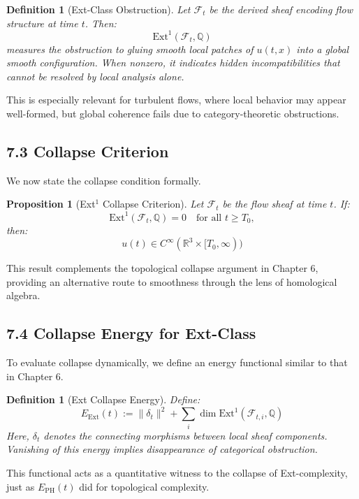 \documentclass[11pt]{article}
\newtheorem{definition}[theorem]{Definition}
\newtheorem{proposition}[theorem]{Proposition}
\begin{document}
\begin{definition}[Ext-Class Obstruction]
Let \( \mathcal{F}_t \) be the derived sheaf encoding flow structure at time \( t \).  
Then:
\[
\mathrm{Ext}^1(\mathcal{F}_t, \mathbb{Q})
\]
measures the obstruction to gluing smooth local patches of \( u(t,x) \) into a global smooth configuration.  
When nonzero, it indicates hidden incompatibilities that cannot be resolved by local analysis alone.
\end{definition}

This is especially relevant for turbulent flows, where local behavior may appear well-formed,  
but global coherence fails due to category-theoretic obstructions.

\subsection{7.3 Collapse Criterion}

We now state the collapse condition formally.

\begin{proposition}[Ext$^1$ Collapse Criterion]
\label{prop:extcollapse}
Let \( \mathcal{F}_t \) be the flow sheaf at time \( t \).  
If:
\[
\mathrm{Ext}^1(\mathcal{F}_t, \mathbb{Q}) = 0 \quad \text{for all } t \ge T_0,
\]
then:
\[
u(t) \in C^\infty(\mathbb{R}^3 \times [T_0, \infty))
\]
\end{proposition}

This result complements the topological collapse argument in Chapter 6,  
providing an alternative route to smoothness through the lens of homological algebra.

\subsection{7.4 Collapse Energy for Ext-Class}

To evaluate collapse dynamically, we define an energy functional similar to that in Chapter 6.

\begin{definition}[Ext Collapse Energy]
Define:
\[
E_{\mathrm{Ext}}(t) := \|\delta_t\|^2 + \sum_i \dim \mathrm{Ext}^1(\mathcal{F}_{t,i}, \mathbb{Q})
\]
Here, \( \delta_t \) denotes the connecting morphisms between local sheaf components.  
Vanishing of this energy implies disappearance of categorical obstruction.
\end{definition}

This functional acts as a quantitative witness to the collapse of Ext-complexity,  
just as \( E_{\mathrm{PH}}(t) \) did for topological complexity.
\end{document}
